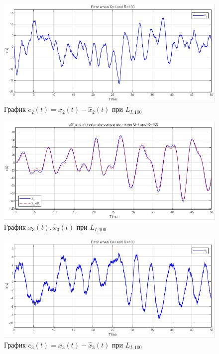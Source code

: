 \documentclass[a4paper, 12pt]{article}
\begin{document}
    \begin{figure}[H]
        \centering
        \includegraphics[scale=0.75]{2task_eee2.png}
        \captionsetup{skip=0pt}
        \caption{График $e_2(t)=x_2(t)-\hat{x}_2(t)$ при $L_{I,100}$}
        \label{fig:2task_eee2}
    \end{figure}
    \begin{figure}[H]
        \centering
        \includegraphics[scale=0.75]{2task_xxx3.png}
        \captionsetup{skip=0pt}
        \caption{График $x_3(t),\hat{x}_3(t)$ при $L_{I,100}$}
        \label{fig:2task_xxx3}
    \end{figure}
    \begin{figure}[H]
        \centering
        \includegraphics[scale=0.75]{2task_eee3.png}
        \captionsetup{skip=0pt}
        \caption{График $e_3(t)=x_3(t)-\hat{x}_3(t)$ при $L_{I,100}$}
        \label{fig:2task_eee3}
    \end{figure}
\end{document}
